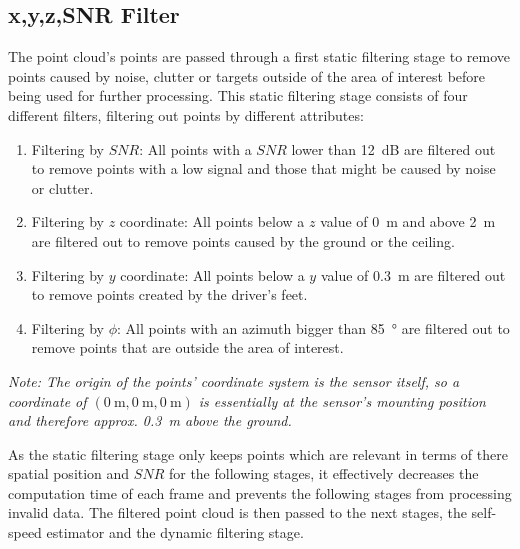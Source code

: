 \subsection{x,y,z,SNR Filter}
The point cloud's points are passed through a first static filtering stage to remove points caused by noise, clutter or targets outside of the area of interest before being used for further processing.
This static filtering stage consists of four different filters, filtering out points by different attributes:
\begin{enumerate}
    \item Filtering by $SNR$: All points with a $SNR$ lower than \SI{12}{\deci\bel} are filtered out to remove points with a low signal and those that might be caused by noise or clutter.
    \item Filtering by $z$ coordinate: All points below a $z$ value of \SI{0}{\meter} and above \SI{2}{\meter} are filtered out to remove points caused by the ground or the ceiling.
    \item Filtering by $y$ coordinate: All points below a $y$ value of \SI{0.3}{\meter} are filtered out to remove points created by the driver's feet.
    \item Filtering by $\phi$: All points with an azimuth bigger than \SI{85}{\degree} are filtered out to remove points that are outside the area of interest.
\end{enumerate}
\textit{Note: The origin of the points' coordinate system is the sensor itself, so a coordinate of $(\SI{0}{\meter},\SI{0}{\meter},\SI{0}{\meter})$ is essentially at the sensor's mounting position and therefore approx. \SI{0.3}{\meter} above the ground.}
\par
As the static filtering stage only keeps points which are relevant in terms of there spatial position and $SNR$ for the following stages, it effectively decreases the computation time of each frame and prevents the following stages from processing invalid data.
The filtered point cloud is then passed to the next stages, the self-speed estimator and the dynamic filtering stage.

